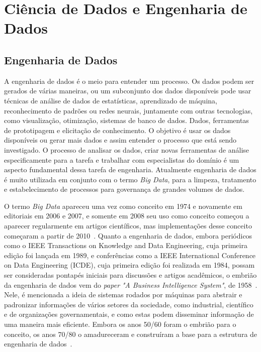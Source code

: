 \documentclass[Portugues,Final]{ic-tese-v3}
\begin{document}
\section{Ciência de Dados e Engenharia de Dados}
\label{sec:CienciaEngDados}

\subsection{Engenharia de Dados}

A engenharia de dados é o meio para entender um processo. Os dados podem ser gerados de várias maneiras, ou um subconjunto dos dados disponíveis pode usar técnicas de análise de dados de estatísticas, aprendizado de máquina, reconhecimento de padrões ou redes neurais, juntamente com outras tecnologias, como visualização, otimização, sistemas de banco de dados. Dados, ferramentas de prototipagem e elicitação de conhecimento. O objetivo é usar os dados disponíveis ou gerar mais dados e assim entender o processo que está sendo investigado. O processo de analisar os dados, criar novas ferramentas de análise especificamente para a tarefa e trabalhar com especialistas do domínio é um aspecto fundamental dessa tarefa de engenharia. Atualmente engenharia de dados é muito utilizada em conjunto com o termo \textit{Big Data}, para a limpeza, tratamento e estabelecimento de processos para governança de grandes volumes de dados.

O termo \textit{Big Data} apareceu uma vez como conceito em 1974 e novamente em editoriais em 2006 e 2007, e somente em 2008 seu uso como conceito começou a aparecer regularmente em artigos científicos, mas implementações desse conceito começaram a partir de 2010~\cite{Raban_2020}. Quanto a engenharia de dados, embora periódicos como o IEEE Transactions on Knowledge and Data Engineering, cuja primeira edição foi lançada em 1989, e conferências como a IEEE International Conference on Data Engineering (ICDE), cuja primeira edição foi realizada em 1984, possam ser consideradas pontapés iniciais para discussões e artigos acadêmicos, o embrião da engenharia de dados vem do \textit{paper} \textit{"A Business Intelligence System"}, de 1958~\cite{Panoply_2017}. Nele, é mencionada a ideia de sistemas rodados por máquinas para abstrair e padronizar informações de vários setores da sociedade, como industrial, científico e de organizações governamentais, e como estas podem disseminar informação de uma maneira mais eficiente. Embora os anos 50/60 foram o embrião para o conceito, os anos 70/80 o amadureceram e construíram a base para a estrutura de engenharia de dados~\cite{Panoply_2017}.
\end{document}
